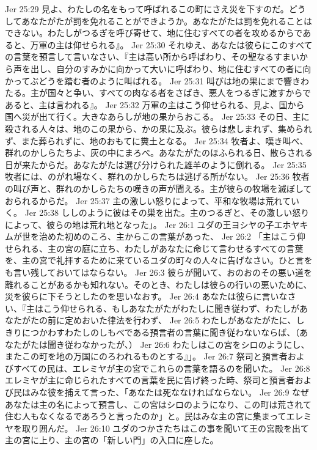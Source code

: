 Jer 25:29  見よ、わたしの名をもって呼ばれるこの町にさえ災を下すのだ。どうしてあなたがたが罰を免れることができようか。あなたがたは罰を免れることはできない。わたしがつるぎを呼び寄せて、地に住むすべての者を攻めるからであると、万軍の主は仰せられる』。
Jer 25:30  それゆえ、あなたは彼らにこのすべての言葉を預言して言いなさい、『主は高い所から呼ばわり、その聖なるすまいから声を出し、自分のすみかに向かって大いに呼ばわり、地に住むすべての者に向かってぶどうを踏む者のように叫ばれる。
Jer 25:31  叫びは地の果にまで響きわたる。主が国々と争い、すべての肉なる者をさばき、悪人をつるぎに渡すからであると、主は言われる』。
Jer 25:32  万軍の主はこう仰せられる、見よ、国から国へ災が出て行く。大きなあらしが地の果からおこる。
Jer 25:33  その日、主に殺される人々は、地のこの果から、かの果に及ぶ。彼らは悲しまれず、集められず、また葬られずに、地のおもてに糞土となる。
Jer 25:34  牧者よ、嘆き叫べ、群れのかしらたちよ、灰の中にまろべ。あなたがたのほふられる日、散らされる日が来たからだ。あなたがたは選び分けられた雄羊のように倒れる。
Jer 25:35  牧者には、のがれ場なく、群れのかしらたちは逃げる所がない。
Jer 25:36  牧者の叫び声と、群れのかしらたちの嘆きの声が聞える。主が彼らの牧場を滅ぼしておられるからだ。
Jer 25:37  主の激しい怒りによって、平和な牧場は荒れていく。
Jer 25:38  ししのように彼はその巣を出た。主のつるぎと、その激しい怒りによって、彼らの地は荒れ地となった」。
Jer 26:1  ユダの王ヨシヤの子エホヤキムが世を治めた初めのころ、主からこの言葉があった、
Jer 26:2  「主はこう仰せられる、主の宮の庭に立ち、わたしがあなたに命じて言わせるすべての言葉を、主の宮で礼拝するために来ているユダの町々の人々に告げなさい。ひと言をも言い残しておいてはならない。
Jer 26:3  彼らが聞いて、おのおのその悪い道を離れることがあるかも知れない。そのとき、わたしは彼らの行いの悪いために、災を彼らに下そうとしたのを思いなおす。
Jer 26:4  あなたは彼らに言いなさい、『主はこう仰せられる、もしあなたがたがわたしに聞き従わず、わたしがあなたがたの前に定めおいた律法を行わず、
Jer 26:5  わたしがあなたがたに、しきりにつかわすわたしのしもべである預言者の言葉に聞き従わないならば、（あなたがたは聞き従わなかったが、）
Jer 26:6  わたしはこの宮をシロのようにし、またこの町を地の万国にのろわれるものとする』」。
Jer 26:7  祭司と預言者およびすべての民は、エレミヤが主の宮でこれらの言葉を語るのを聞いた。
Jer 26:8  エレミヤが主に命じられたすべての言葉を民に告げ終った時、祭司と預言者および民はみな彼を捕えて言った、「あなたは死ななければならない。
Jer 26:9  なぜあなたは主の名によって預言し、この宮はシロのようになり、この町は荒されて住む人もなくなるであろうと言ったのか」と。民はみな主の宮に集まってエレミヤを取り囲んだ。
Jer 26:10  ユダのつかさたちはこの事を聞いて王の宮殿を出て主の宮に上り、主の宮の「新しい門」の入口に座した。
